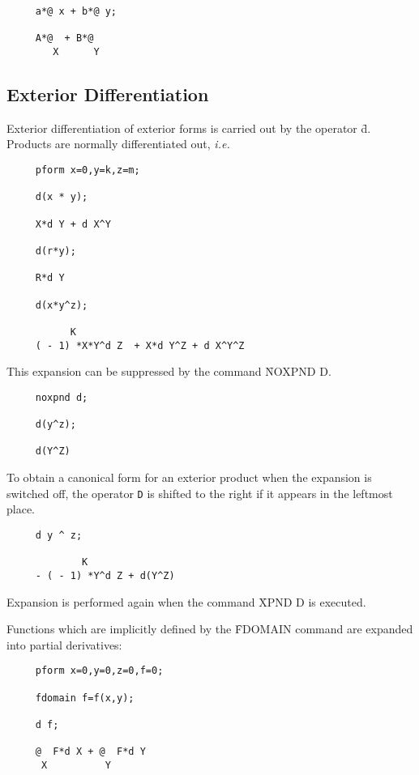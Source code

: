 \example{}

\begin{verbatim}
     a*@ x + b*@ y;

     A*@  + B*@
        X      Y
\end{verbatim}

\subsection{Exterior Differentiation}
Exterior differentiation of exterior forms is carried out by the
operator \f{d}\label{d}.  Products are normally differentiated out,
\emph{i.e.}
\begin{verbatim}
     pform x=0,y=k,z=m;

     d(x * y);

     X*d Y + d X^Y

     d(r*y);

     R*d Y

     d(x*y^z);

           K
     ( - 1) *X*Y^d Z  + X*d Y^Z + d X^Y^Z
\end{verbatim}

This expansion can be suppressed by the command \f{NOXPND D}\label{NOXPNDD}.
\hypertarget{command:NOXPND}{}

\begin{verbatim}
     noxpnd d;

     d(y^z);

     d(Y^Z)
\end{verbatim}

To obtain a canonical form for an exterior product when the expansion
is switched off, the operator \texttt{D} is shifted to the right if it
appears in the leftmost place.

\begin{verbatim}
     d y ^ z;

             K
     - ( - 1) *Y^d Z + d(Y^Z)
\end{verbatim}

Expansion is performed again when the command \f{XPND D}\label{XPNDD}
is executed. \hypertarget{command:XPND}{}

Functions which are implicitly defined by the \f{FDOMAIN} command are
expanded into partial derivatives:

\begin{verbatim}
     pform x=0,y=0,z=0,f=0;

     fdomain f=f(x,y);

     d f;

     @  F*d X + @  F*d Y
      X          Y
\end{verbatim}

